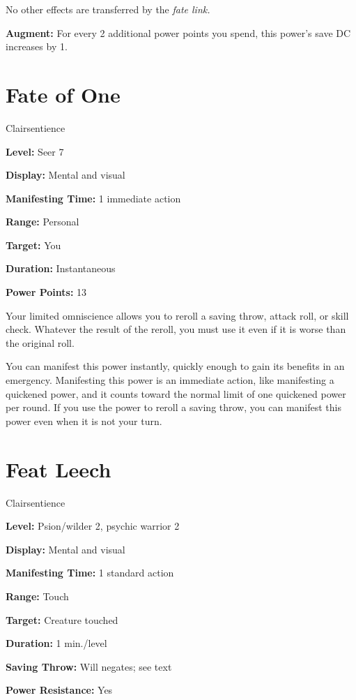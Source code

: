 \documentclass{article}
\begin{document}
No other effects are transferred by the \textit{fate link.}

\textbf{Augment:} For every 2 additional power points you spend, this power's save 
DC increases by 1.

\vspace{12pt}
\section*{Fate of One}

Clairsentience

\textbf{Level:} Seer 7

\textbf{Display:} Mental and visual

\textbf{Manifesting Time:} 1 immediate action

\textbf{Range:} Personal

\textbf{Target:} You

\textbf{Duration:} Instantaneous

\textbf{Power Points:} 13

Your limited omniscience allows you to reroll a saving throw, attack roll, or skill 
check. Whatever the result of the reroll, you must use it even if it is worse than 
the original roll.

You can manifest this power instantly, quickly enough to gain its benefits in an 
emergency. Manifesting this power is an immediate action, like manifesting a quickened 
power, and it counts toward the normal limit of one quickened power per round. 
If you use the power to reroll a saving throw, you can manifest this power even 
when it is not your turn.

\vspace{12pt}
\section*{Feat Leech}

Clairsentience

\textbf{Level:} Psion/wilder 2, psychic warrior 2

\textbf{Display:} Mental and visual

\textbf{Manifesting Time:} 1 standard action

\textbf{Range:} Touch

\textbf{Target:} Creature touched

\textbf{Duration:} 1 min./level

\textbf{Saving Throw:} Will negates; see text

\textbf{Power Resistance:} Yes
\end{document}

